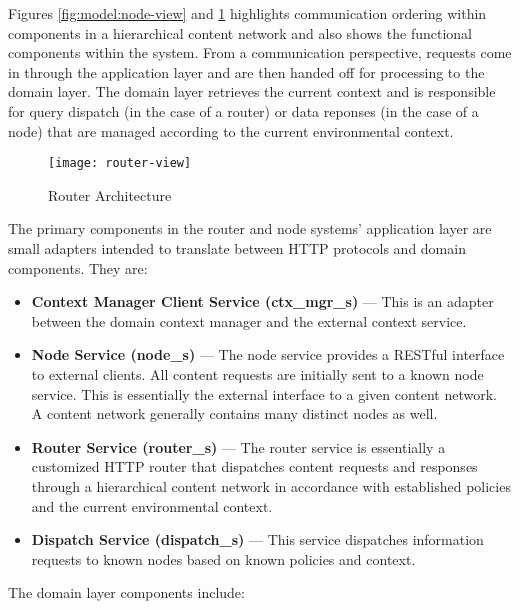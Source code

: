 Figures \ref{fig:model:node-view} and \ref{fig:model:router-view} highlights communication ordering within components in a hierarchical content network and also shows the functional components within the system.  From a communication perspective, requests come in through the application layer and are then handed off for processing to the domain layer.  The domain layer retrieves the current context and is responsible for query dispatch (in the case of a router) or data reponses (in the case of a node) that are managed according to the current environmental context.

\begin{figure}[!t]
\centering
\texttt{[image: router-view]}
\caption{Router Architecture}
\label{fig:model:router-view}
\end{figure}

The primary components in the router and node systems' application layer are small adapters intended to translate between HTTP protocols and domain components.  They are:

\begin{itemize}
\item \textbf{Context Manager Client Service (ctx\_mgr\_s)} --- This is an adapter between the domain context manager and the external context service.
\item \textbf{Node Service (node\_s)} --- The node service provides a RESTful interface to external clients.  All content requests are initially sent to a known node service.  This is essentially the external interface to a given content network.  A content network generally contains many distinct nodes as well.
\item \textbf{Router Service (router\_s)} --- The router service is essentially a customized HTTP router that dispatches content requests and responses through a hierarchical content network in accordance with established policies and the current environmental context.
\item \textbf{Dispatch Service (dispatch\_s)} --- This service dispatches information requests to known nodes based on known policies and context.
\end{itemize}

The domain layer components include:

